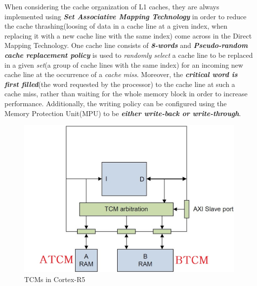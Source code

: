 \documentclass[a4paper,11pt]{article}
\begin{document}
 When considering the cache organization of L1 caches, they are always implemented using \textit{\textbf{Set Associative Mapping Technology}} in order to reduce the cache thrashing(loosing of data in a cache line at a given index, when replacing it with a new cache line with the same index) come across in the Direct Mapping Technology. One cache line consists of \textit{\textbf{8-words}} and \textit{\textbf{Pseudo-random cache replacement policy}}  is used to \textit{randomly select} a cache line to be replaced in a given \textit{set}(a group of cache lines with the same index) for an incoming new cache line at the occurrence of a \textit{cache miss}. Moreover, the \textbf{\textit{critical word is first filled}}(the word requested by the processor) to the cache line at such a cache miss, rather than waiting for the whole memory block in order to increase performance. Additionally, the writing policy can be configured using the Memory Protection Unit(MPU) to be \textbf{\textit{either write-back or write-through}}.



\begin{figure}
	\includegraphics[scale= 0.315]{figures/tcm}
	\caption{TCMs in Cortex-R5} \label{tcm}
\end{figure}
\end{document}
